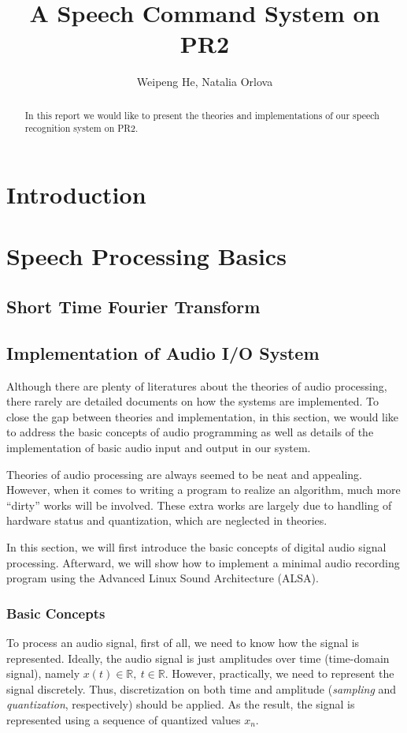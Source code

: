 \documentclass[11pt,a4paper]{report}
\begin{document}
\title{A Speech Command System on PR2}
\author{Weipeng He, Natalia Orlova}
\maketitle

\begin{abstract}
  In this report we would like to present the theories and implementations of our speech recognition system on PR2. 
\end{abstract}

\tableofcontents

\chapter{Introduction}

\chapter{Speech Processing Basics}
\section{Short Time Fourier Transform}

\section{Implementation of Audio I/O System}
Although there are plenty of literatures about the theories of audio processing, there rarely are detailed documents on how the systems are implemented. To close the gap between theories and implementation, in this section, we would like to address the basic concepts of audio programming as well as details of the implementation of basic audio input and output in our system.

Theories of audio processing are always seemed to be neat and appealing. However, when it comes to writing a program to realize an algorithm, much more ``dirty'' works will be involved. These extra works are largely due to handling of hardware status and quantization, which are neglected in theories.

In this section, we will first introduce the basic concepts of digital audio signal processing. Afterward, we will show how to implement a minimal audio recording program using the Advanced Linux Sound Architecture (ALSA).

\subsection{Basic Concepts}
To process an audio signal, first of all, we need to know how the signal is represented. Ideally, the audio signal is just amplitudes over time (time-domain signal), namely $ x(t) \in \mathbb{R},~ t \in \mathbb{R} $. However, practically, we need to represent the signal discretely. Thus, discretization on both time and amplitude (\textit{sampling} and \textit{quantization}, respectively) should be applied. As the result, the signal is represented using a sequence of quantized values $x_n$.
\end{document}
